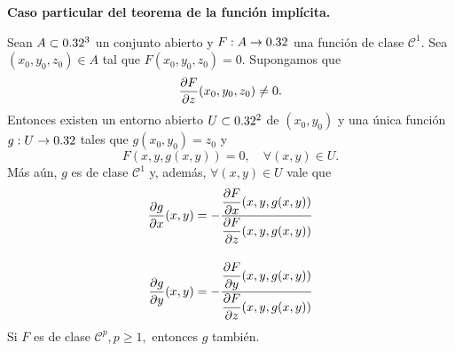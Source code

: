 \begin{theorem}\textbf{Caso particular del teorema de la funci\'on impl\'icita.} \label{teo:implicit_part}
\mbox{}

Sean $A \subset 0.32^3$ un conjunto abierto y $F: A \to 0.32$ una funci\'on de clase $\mathcal{C}^1$. Sea $(x_0,y_0,z_0) \in A$ tal que $F(x_0,y_0,z_0) = 0$. Supongamos que 
 \[
    \dfrac{\partial F}{\partial z} (x_0,y_0,z_0) \ne 0.
 \]
 Entonces existen un entorno abierto $U \subset 0.32^2$ de $(x_0,y_0)$
 y una \'unica funci\'on $g: U \to 0.32$ tales que $g(x_0,y_0) = z_0$ y
 \[
  F(x,y,g(x,y)) = 0,\quad \forall (x,y) \in U.
 \]
 M\'as a\'un, $g$ es de clase $\mathcal{C}^1$ y, adem\'as, $\forall (x,y) \in U$ vale que
 \begin{align*}
  \dfrac{\partial g}{\partial x}(x,y) &= -\frac{\dfrac{\partial F}{\partial x} (x,y,g(x,y))}{\dfrac{\partial F}{\partial z} (x,y,g(x,y))}  \\[.4cm]
  \dfrac{\partial g}{\partial y}(x,y) &= -\frac{\dfrac{\partial F}{\partial y} (x,y,g(x,y))}{\dfrac{\partial F}{\partial z} (x,y,g(x,y))} \\
 \end{align*}
 Si $F$ es de clase $\mathcal{C}^p, p \ge 1,$ entonces $g$ tambi\'en.
\end{theorem}


